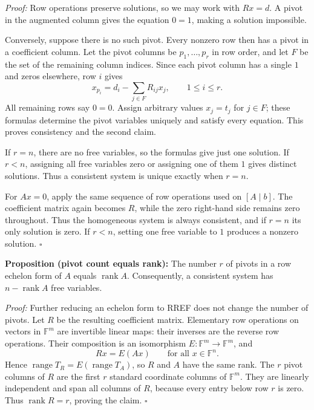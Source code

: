 \documentclass[a4paper,11pt,abstract=true]{scrartcl}
\theoremstyle{dotlessP}
\theoremstyle{dotlessS}
\theoremstyle{remark}
\theoremstyle{definition}
\begin{document}
\begin{claim_box}
\textit{Proof:} Row operations preserve solutions, so we may work with
$Rx=d$. A pivot in the augmented column gives the equation $0=1$,
making a solution impossible.

Conversely, suppose there is no such pivot. Every nonzero row then
has a pivot in a coefficient column. Let the pivot columns be
$p_1,\ldots,p_r$ in row order, and let $F$ be the set of the remaining
column indices. Since each pivot column has a single $1$ and zeros
elsewhere, row $i$ gives
\[
x_{p_i}=d_i-\sum_{j\in F}R_{ij}x_j,
\qquad 1\leq i\leq r.
\]
All remaining rows say $0=0$. Assign arbitrary values $x_j=t_j$ for
$j\in F$; these formulas determine the pivot variables uniquely and
satisfy every equation. This proves consistency and the second claim.

If $r=n$, there are no free variables, so the formulas give just one
solution. If $r<n$, assigning all free variables zero or assigning
one of them $1$ gives distinct solutions. Thus a consistent system
is unique exactly when $r=n$.

For $Ax=0$, apply the same sequence of row operations used on $[A\mid b]$.
The coefficient matrix again becomes $R$, while the zero right-hand
side remains zero throughout.
Thus the homogeneous system is always consistent, and if $r=n$ its
only solution is zero. If $r<n$, setting one free variable to $1$
produces a nonzero solution. \hfill$\square$
\end{claim_box}

\begin{claim_box}
\textbf{Proposition (pivot count equals rank):} The number $r$
of pivots in a row echelon form of $A$ equals $\operatorname{rank}A$.
Consequently, a consistent system has $n-\operatorname{rank}A$ free
variables.

\textit{Proof:} Further reducing an echelon form to RREF does not
change the number of pivots. Let $R$ be the resulting coefficient
matrix. Elementary row operations on vectors in $\mathbb{F}^m$ are
invertible linear maps: their inverses are the reverse row operations.
Their composition is an isomorphism $E:\mathbb{F}^m\longrightarrow
\mathbb{F}^m$, and
\[
Rx=E(Ax)\qquad\text{for all }x\in\mathbb{F}^n.
\]
Hence $\operatorname{range}T_R=E(\operatorname{range}T_A)$, so $R$
and $A$ have the same rank. The $r$ pivot columns of $R$ are the first
$r$ standard coordinate columns of $\mathbb{F}^m$. They are linearly
independent and span all columns of $R$, because every entry below
row $r$ is zero. Thus $\operatorname{rank}R=r$, proving the claim.
\hfill$\square$
\end{claim_box}
\end{document}

